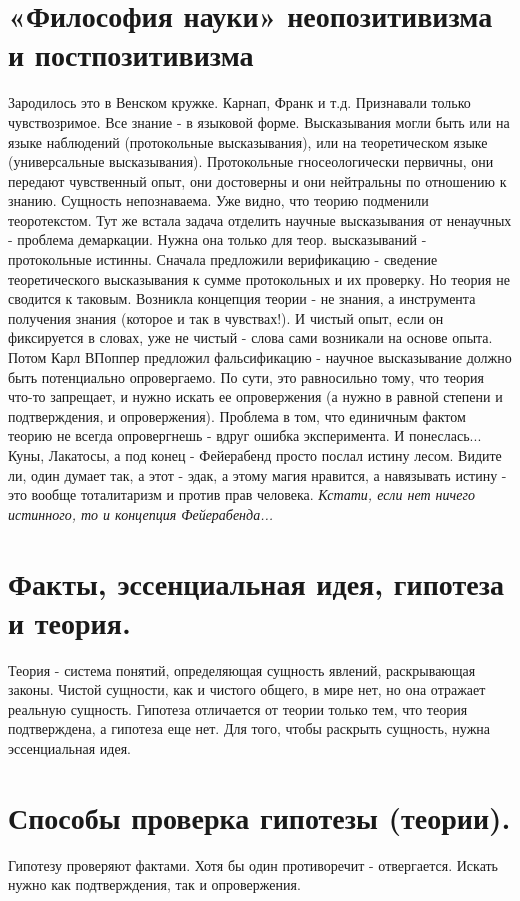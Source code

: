 \section{ «Философия науки» неопозитивизма и постпозитивизма }
Зародилось это в Венском кружке. Карнап, Франк и т.д. Признавали только чувствозримое. Все знание - в языковой форме. Высказывания могли быть или на языке наблюдений (протокольные высказывания), или на теоретическом языке (универсальные высказывания). Протокольные
 гносеологически первичны, они передают чувственный опыт, они достоверны и они нейтральны по отношению к знанию. Сущность непознаваема. Уже видно, что теорию подменили теоротекстом. Тут же встала задача отделить научные высказывания от ненаучных - проблема демаркации. Нужна она только для теор. высказываний - протокольные истинны. Сначала предложили верификацию - сведение теоретического высказывания к сумме протокольных и их проверку. Но теория не сводится к таковым. Возникла концепция теории - не знания, а инструмента получения знания (которое и так в чувствах!). И чистый опыт, если он фиксируется в словах, уже не чистый - слова сами возникали на основе опыта. Потом Карл ВПоппер предложил фальсификацию - научное высказывание должно быть потенциально опровергаемо. По сути, это равносильно тому, что теория что-то запрещает, и нужно искать ее опровержения (а нужно в равной степени и подтверждения, и опровержения). Проблема в том, что единичным фактом теорию не всегда опровергнешь - вдруг ошибка эксперимента. И понеслась... Куны, Лакатосы, а под конец - Фейерабенд просто послал истину лесом. Видите ли, один думает так, а этот - эдак, а этому магия нравится, а навязывать истину - это вообще тоталитаризм и против прав человека. \textit{Кстати, если нет ничего истинного, то и концепция Фейерабенда...}

\section{ Факты, эссенциальная идея, гипотеза и теория.}
Теория - система понятий, определяющая сущность явлений, раскрывающая законы. Чистой сущности, как и чистого общего, в мире нет, но она отражает реальную сущность. Гипотеза отличается от теории только тем, что теория подтверждена, а гипотеза еще нет. Для того, чтобы раскрыть сущность, нужна эссенциальная идея. 
 
\section{ Способы проверка гипотезы (теории).}
Гипотезу проверяют фактами. Хотя бы один противоречит - отвергается. Искать нужно как подтверждения, так и опровержения.

